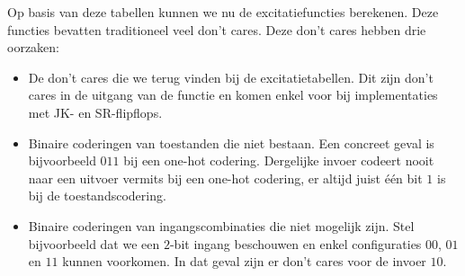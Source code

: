\begin{table}[hbt]
\centering
{}
\caption{Excitatietabellen van de verschillende soorten flipflops}
\end{table}

Op basis van deze tabellen kunnen we nu de excitatiefuncties berekenen. Deze functies bevatten traditioneel veel don't cares. Deze don't cares hebben drie oorzaken:

\begin{itemize}
 \item De don't cares die we terug vinden bij de excitatietabellen. Dit zijn don't cares in de uitgang van de functie en komen enkel voor bij implementaties met JK- en SR-flipflops.
 \item Binaire coderingen van toestanden die niet bestaan. Een concreet geval is bijvoorbeeld $011$ bij een one-hot codering. Dergelijke invoer codeert nooit naar een uitvoer vermits bij een one-hot codering, er altijd juist \'e\'en bit $1$ is bij de toestandscodering.
 \item Binaire coderingen van ingangscombinaties die niet mogelijk zijn. Stel bijvoorbeeld dat we een $2$-bit ingang beschouwen en enkel configuraties $00$, $01$ en $11$ kunnen voorkomen. In dat geval zijn er don't cares voor de invoer $10$.
\end{itemize}


